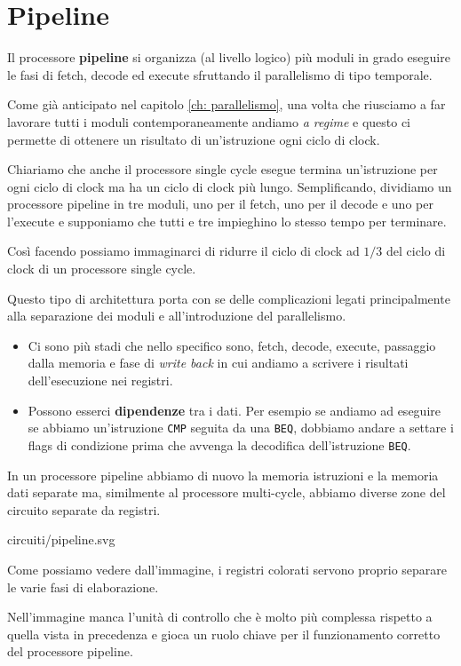 \section{Pipeline}
Il processore \textbf{pipeline} si organizza (al livello logico) più moduli in grado eseguire le
fasi di fetch, decode ed execute sfruttando il parallelismo di tipo temporale.

Come già anticipato nel capitolo \ref{ch: parallelismo}, una volta che riusciamo a far lavorare
tutti i moduli contemporaneamente andiamo \emph{a regime} e questo ci permette di ottenere un
risultato di un'istruzione ogni ciclo di clock.

Chiariamo che anche il processore single cycle esegue termina un'istruzione per ogni ciclo di clock
ma ha un ciclo di clock più lungo. Semplificando, dividiamo un processore pipeline in tre moduli,
uno per il fetch, uno per il decode e uno per l'execute e supponiamo che tutti e tre impieghino lo
stesso tempo per terminare.

Così facendo possiamo immaginarci di ridurre il ciclo di clock ad $1 / 3$ del ciclo di clock di un
processore single cycle.

Questo tipo di architettura porta con se delle complicazioni legati principalmente alla separazione
dei moduli e all'introduzione del parallelismo.
\begin{itemize}
	\item Ci sono più stadi che nello specifico sono, fetch, decode, execute, passaggio dalla
	      memoria e fase di \emph{write back} in cui andiamo a scrivere i risultati dell'esecuzione
	      nei registri.
	\item Possono esserci \textbf{dipendenze} tra i dati. Per esempio se andiamo ad eseguire se
	      abbiamo un'istruzione \verb|CMP| seguita da una \verb|BEQ|, dobbiamo andare a settare
	      i flags di condizione prima che avvenga la decodifica dell'istruzione \verb|BEQ|.
\end{itemize}
In un processore pipeline abbiamo di nuovo la memoria istruzioni e la memoria dati separate ma,
similmente al processore multi-cycle, abbiamo diverse zone del circuito separate da registri.
\begin{center}
	 {circuiti/pipeline.svg}
\end{center}
Come possiamo vedere dall'immagine, i registri colorati servono proprio separare le varie fasi di
elaborazione.

Nell'immagine manca l'unità di controllo che è molto più complessa rispetto a quella vista in
precedenza e gioca un ruolo chiave per il funzionamento corretto del processore pipeline.

